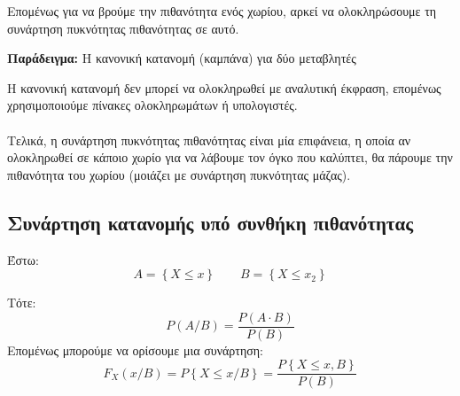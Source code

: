 \documentclass[11pt,a4paper,notitlepage,fleqn,final]{article}
\begin{document}
	Επομένως για να βρούμε την πιθανότητα ενός χωρίου, αρκεί να
	ολοκληρώσουμε τη συνάρτηση πυκνότητας πιθανότητας σε αυτό.
	
	\textbf{Παράδειγμα:} Η κανονική κατανομή (καμπάνα)
	για δύο μεταβλητές
	
	
	Η κανονική κατανομή δεν μπορεί να ολοκληρωθεί με αναλυτική έκφραση,
	επομένως χρησιμοποιούμε πίνακες ολοκληρωμάτων ή υπολογιστές.
	
	\paragraph{}
	Τελικά, η συνάρτηση πυκνότητας πιθανότητας είναι μία επιφάνεια,
	η οποία αν ολοκληρωθεί σε κάποιο χωρίο για να λάβουμε τον όγκο που
	καλύπτει, θα πάρουμε την πιθανότητα του χωρίου (μοιάζει με συνάρτηση
	πυκνότητας μάζας).
	
	\subsection{Συνάρτηση κατανομής υπό συνθήκη πιθανότητας}
	Έστω:
	\[
	A = \left\lbrace X \leq x \right\rbrace
	\qquad
	B = \left\lbrace X \leq x_2 \right\rbrace
	\]
	
	Τότε:
	\[
	P(A/B) = \frac{P(A\cdot B)}{P(B)}
	\]
	Επομένως μπορούμε να ορίσουμε μια συνάρτηση:
	\[
	\boxed{
		F_X(x/B) = P\left\lbrace X\leq x/B \right\rbrace
		= \frac{P\left\lbrace X\leq x, B \right\rbrace}{P(B)}
		}
	\]
	
\end{document}

